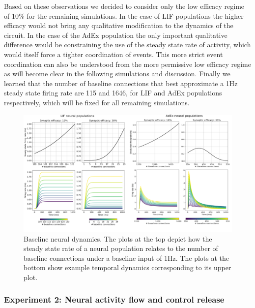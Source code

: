 \documentclass[10pt]{article}
\begin{document}
{Based on these observations we decided to consider only the low efficacy regime of 10\% for the remaining simulations.
In the case of LIF populations the higher efficacy would not bring any qualitative modification to the dynamics of the circuit.
In the case of the AdEx population the only important qualitative difference would be constraining the use of the steady state rate of activity, which would itself force a tighter coordination of events.
This more strict event coordination can also be understood from the more permissive low efficacy regime as will become clear in the following simulations and discussion.
Finally we learned that the number of baseline connections that best approximate a 1Hz steady state firing rate are 115 and 1646, for LIF and AdEx populations respectively, which will be fixed for all remaining simulations.

\begin{figure}[h!]
  \begin{center}
    \includegraphics[width=1.00\columnwidth]{figures/experiment_001/experiment_001}
    \caption{Baseline neural dynamics.
      The plots at the top depict how the steady state rate of a neural population relates to the number of baseline connections under a baseline input of 1Hz.
      The plots at the bottom show example temporal dynamics corresponding to its upper plot.}
    \label{674368}

  \end{center}
\end{figure}

\subsubsection{Experiment 2: Neural activity flow and control
  release}\label{experiment-2-neural-activity-flow-and-control-release}

}
\end{document}
